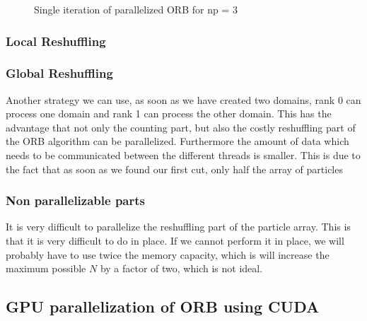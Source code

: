 \documentclass[]{article}
\begin{document}
\begin{figure}
\begin{center}
	\end{center}
\caption{Single iteration of parallelized ORB for np = 3}
\label{fig:orb_parallel}
\end{figure}
\subsubsection{Local Reshuffling}

\subsubsection{Global Reshuffling}

Another strategy we can use, as soon as we have created two domains, rank 0 can process one domain and rank 1 can process the other domain. This has the advantage that not only the counting part, but also the costly reshuffling part of the ORB algorithm can be parallelized. Furthermore the amount of data which needs to be communicated between the different threads is smaller. This is due to the fact that as soon as we found our first cut, only half the array of particles 

\vspace{5mm}

\subsubsection{Non parallelizable parts}
It is very difficult to parallelize the reshuffling part of the particle array. This is that it is very difficult to do in place. If we cannot perform it in place, we will probably have to use twice the memory capacity, which is will increase the maximum possible $N$ by a factor of two, which is not ideal.


\subsection{GPU parallelization of ORB using CUDA }



\end{document}
